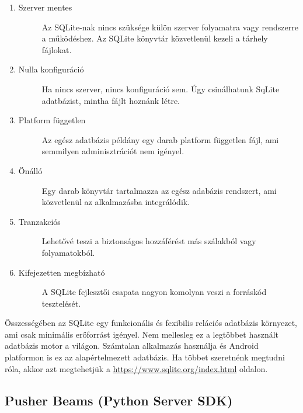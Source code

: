 \documentclass{thesis-ekf}
\theoremstyle{definition}
\theoremstyle{remark}
\begin{document}
\begin{enumerate}
	\item
	\begin{description}
		\item[Szerver mentes] Az SQLite-nak nincs szüksége külön szerver folyamatra vagy rendszerre a működéshez. Az SQLite könyvtár közvetlenül kezeli a tárhely fájlokat.
	\end{description}
	\item
	\begin{description}
		\item[Nulla konfiguráció] Ha nincs szerver, nincs konfiguráció sem. Úgy csinálhatunk SqLite adatbázist, mintha fájlt hoznánk létre.
	\end{description}
	\item
	\begin{description}
		\item[Platform független] Az egész adatbázis példány egy darab platform független fájl, ami semmilyen adminisztrációt nem igényel.
	\end{description}
	\item
	\begin{description}
		\item[Önálló] Egy darab könyvtár tartalmazza az egész adabázis rendszert, ami közvetlenül az alkalmazásba integrálódik.
	\end{description}
	\item
	\begin{description}
		\item[Tranzakciós] Lehetővé teszi a biztonságos hozzáférést más szálakból vagy folyamatokból.
	\end{description}
	\item
	\begin{description}
		\item[Kifejezetten megbízható] A SQLite fejlesztői csapata nagyon komolyan veszi a forráskód tesztelését.
	\end{description}
\end{enumerate}

Összességében az SQLite egy funkcionális és fexibilis relációs adatbázis környezet, ami csak minimális erőforrást igényel.
\cite{sqlite}
Nem mellesleg ez a legtöbbet használt adatbázis motor a világon. 
Számtalan alkalmazás használja és Android platformon is ez az alapértelmezett adatbázis.
Ha többet szeretnénk megtudni róla, akkor azt megtehetjük a \url{https://www.sqlite.org/index.html} oldalon.

\subsection{Pusher Beams (Python Server SDK)}\label{pusher_server}
\end{document}

